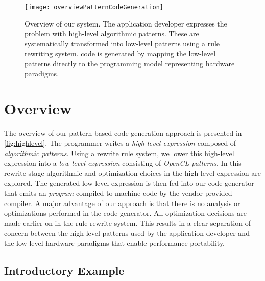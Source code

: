 \begin{figure}[tb]
\centering
\texttt{[image: overviewPatternCodeGeneration]}
\caption{
Overview of our system.
The application developer expresses the problem with high-level algorithmic patterns.
These are systematically transformed into low-level \OpenCL patterns using a rule rewriting system.
\OpenCL code is generated by mapping the low-level patterns directly to the \OpenCL programming model representing hardware paradigms.
}
\label{fig:highlevel}
\end{figure}

\newpage
\section{Overview}
\label{section:code-generation:overview}

The overview of our pattern-based code generation approach is presented in \autoref{fig:highlevel}.
The programmer writes a \emph{high-level expression} composed of \emph{algorithmic patterns}.
Using a rewrite rule system, we lower this high-level expression into a \emph{low-level expression} consisting of \emph{OpenCL patterns}.
In this rewrite stage algorithmic and optimization choices in the high-level expression are explored.
The generated low-level expression is then fed into our code generator that emits an \emph{\OpenCL program} compiled to machine code by the vendor provided \OpenCL compiler.
A major advantage of our approach is that there is no analysis or optimizations performed in the code generator.
All optimization decisions are made earlier on in the rule rewrite system.
This results in a clear separation of concern between the high-level patterns used by the application developer and the low-level hardware paradigms that enable performance portability.


\newpage
\subsection{Introductory Example}

